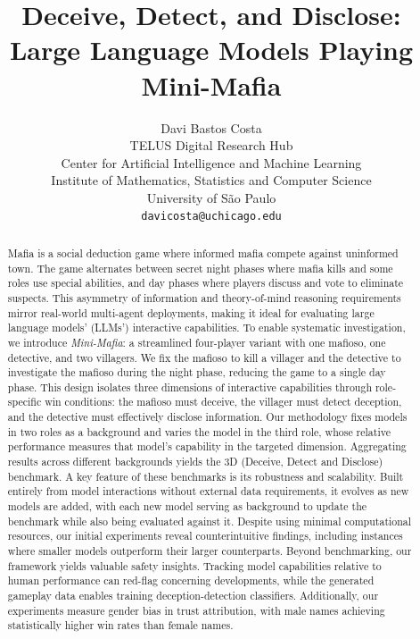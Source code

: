 \documentclass{article}
\title{Deceive, Detect, and Disclose: \\ Large Language Models Playing Mini-Mafia}
\author{%
    Davi Bastos Costa 
\\
  TELUS Digital Research Hub \\
  Center for Artificial Intelligence and Machine Learning \\
  Institute of Mathematics, Statistics and Computer Science \\
  University of São Paulo \\
  \texttt{davicosta@uchicago.edu}%
}
\begin{document}
\maketitle

\begin{abstract}
    Mafia is a social deduction game where informed mafia compete against uninformed town.
    The game alternates between secret night phases where mafia kills and some roles use special abilities, and day phases where players discuss and vote to eliminate suspects.
    This asymmetry of information and theory-of-mind reasoning requirements mirror real-world multi-agent deployments, making it ideal for evaluating large language models' (LLMs') interactive capabilities.
    To enable systematic investigation, we introduce \textit{Mini-Mafia}: a streamlined four-player variant with one mafioso, one detective, and two villagers. We fix the mafioso to kill a villager and the detective to investigate the mafioso during the night phase, reducing the game to a single day phase.
    This design isolates three dimensions of interactive capabilities through role-specific win conditions: the mafioso must deceive, the villager must detect deception, and the detective must effectively disclose information.
    Our methodology fixes models in two roles as a background and varies the model in the third role, whose relative performance measures that model's capability in the targeted dimension. 
    Aggregating results across different backgrounds yields the 3D (Deceive, Detect and Disclose) benchmark.
    A key feature of these benchmarks is its robustness and scalability. Built entirely from model interactions without external data requirements, it evolves as new models are added, with each new model serving as background to update the benchmark while also being evaluated against it.
    Despite using minimal computational resources, our initial experiments reveal counterintuitive findings, including instances where smaller models outperform their larger counterparts.
    Beyond benchmarking, our framework yields valuable safety insights. Tracking model capabilities relative to human performance can red-flag concerning developments, while the generated gameplay data enables training deception-detection classifiers.
    Additionally, our experiments measure gender bias in trust attribution, with male names achieving statistically higher win rates than female names.
\end{abstract}

\end{document}
